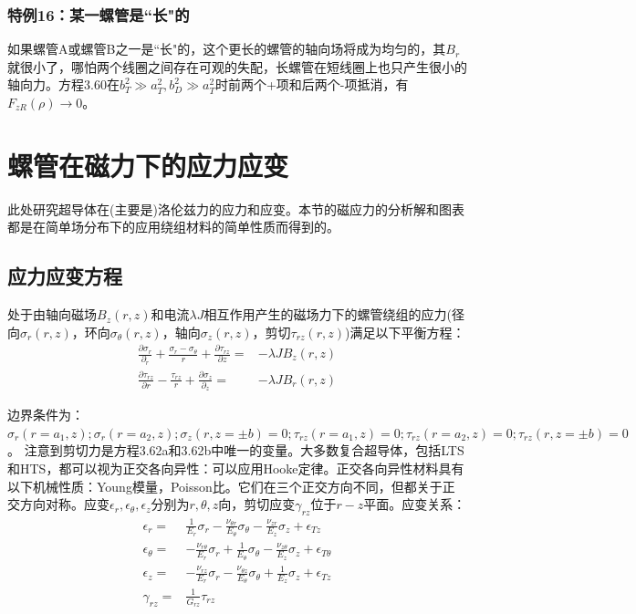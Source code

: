 \subsubsection{特例16：某一螺管是``长"的}
如果螺管A或螺管B之一是``长"的，这个更长的螺管的轴向场将成为均匀的，其$B_r$就很小了，哪怕两个线圈之间存在可观的失配，长螺管在短线圈上也只产生很小的轴向力。方程3.60在$b^2_T\gg a_T^2,b_D^2\gg a_T^2$时前两个+项和后两个-项抵消，有$F_{zR}(\rho)\rightarrow 0$。

\section{螺管在磁力下的应力应变}
此处研究超导体在(主要是)洛伦兹力的应力和应变。本节的磁应力的分析解和图表都是在简单场分布下的应用绕组材料的简单性质而得到的。

\subsection{应力应变方程}
处于由轴向磁场$B_z(r,z)$和电流$\lambda J$相互作用产生的磁场力下的螺管绕组的应力(径向$\sigma_r(r,z)$，环向$\sigma_\theta(r,z)$，轴向$\sigma_z(r,z)$，剪切$\tau_{rz}(r,z)$)满足以下平衡方程：
\begin{subequations}
	\begin{align}
\frac{\partial\sigma_{r}}{\partial_r}+\frac{\sigma_{r}-\sigma_{\theta}}{r}+\frac{\partial \tau_{rz}}{\partial z}=&-\lambda JB_z(r,z)\\
\frac{\partial \tau_{rz}}{\partial r}-\frac{\tau_{rz}}{r}+\frac{\partial \sigma_z}{\partial_z}=&-\lambda JB_r(r,z)
	\end{align}
\end{subequations}

边界条件为：$\sigma_r(r=a_1,z);\sigma_r(r=a_2,z);\sigma_z(r,z=\pm b)=0;\tau_{rz}(r=a_1,z)=0;\tau_{rz}(r=a_2,z)=0;\tau_{rz}(r,z=\pm b)=0$。
注意到剪切力是方程3.62a和3.62b中唯一的变量。大多数复合超导体，包括LTS和HTS，都可以视为正交各向异性：可以应用Hooke定律。正交各向异性材料具有以下机械性质：Young模量，Poisson比。它们在三个正交方向不同，但都关于正交方向对称。应变$\epsilon_r,\epsilon_\theta,\epsilon_z$分别为$r,\theta,z$向，剪切应变$\gamma_{rz}$位于$r-z$平面。应变关系：
\begin{subequations}
	\begin{align}
\epsilon_r=&\frac{1}{E_r}\sigma_r-\frac{\nu_{\theta r}}{E_{\theta}}\sigma_{\theta}-\frac{\nu_{zr}}{E_z}\sigma_z+\epsilon_{Tz}\\
\epsilon_\theta=&-\frac{\nu_{r\theta}}{E_r}\sigma_r+\frac{1}{E_{\theta}}\sigma_{\theta}-\frac{\nu_{z\theta}}{E_z}\sigma_z+\epsilon_{T\theta}\\
\epsilon_z=&-\frac{\nu_{rz}}{E_r}\sigma_r-\frac{\nu_{\theta z}}{E_{\theta}}\sigma_{\theta}+\frac{1}{E_z}\sigma_z+\epsilon_{Tz}\\
\gamma_{rz}=&\frac{1}{G_{{rz}}}\tau_{rz}
	\end{align}
\end{subequations}

